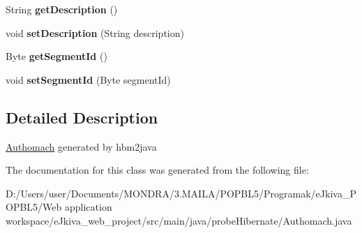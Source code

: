 \begin{DoxyCompactItemize}
String {\bfseries get\+Description} ()
\item 
\mbox{\label{classprobe_hibernate_1_1_authomach_a4f4afd7292d7e730b114c73133065d6a}} 
void {\bfseries set\+Description} (String description)
\item 
\mbox{\label{classprobe_hibernate_1_1_authomach_ab245393fe1c59ff7b5266913c596efe7}} 
Byte {\bfseries get\+Segment\+Id} ()
\item 
\mbox{\label{classprobe_hibernate_1_1_authomach_ab3a834aeea9363777e56dade96d73559}} 
void {\bfseries set\+Segment\+Id} (Byte segment\+Id)
\end{DoxyCompactItemize}


\subsection{Detailed Description}
\mbox{\hyperlink{classprobe_hibernate_1_1_authomach}{Authomach}} generated by hbm2java 

The documentation for this class was generated from the following file\+:\begin{DoxyCompactItemize}
\item 
D\+:/\+Users/user/\+Documents/\+M\+O\+N\+D\+R\+A/3.\+M\+A\+I\+L\+A/\+P\+O\+P\+B\+L5/\+Programak/e\+Jkiva\+\_\+\+P\+O\+P\+B\+L5/\+Web application workspace/e\+Jkiva\+\_\+web\+\_\+project/src/main/java/probe\+Hibernate/Authomach.\+java\end{DoxyCompactItemize}
